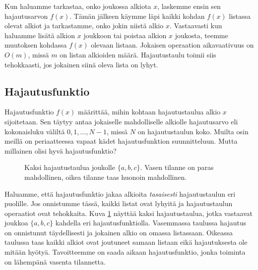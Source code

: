 Kun haluamme tarkastaa, onko joukossa alkiota $x$,
laskemme ensin sen hajautusarvon $f(x)$.
Tämän jälkeen käymme läpi kaikki kohdan $f(x)$
listassa olevat alkiot ja tarkastamme,
onko jokin niistä alkio $x$.
Vastaavasti kun haluamme lisätä alkion $x$ joukkoon
tai poistaa alkion $x$ joukosta,
teemme muutoksen kohdassa $f(x)$ olevaan listaan.
Jokaisen operaation aikavaativuus on $O(m)$,
missä $m$ on listan alkioiden määrä.
Hajautustaulu toimii siis tehokkaasti, jos jokainen
siinä oleva lista on lyhyt.

\subsection{Hajautusfunktio}

Hajautusfunktio $f(x)$ määrittää, mihin kohtaan hajautustaulua
alkio $x$ sijoitetaan.
Sen täytyy antaa jokaiselle mahdolliselle alkiolle
hajautusarvo eli kokonaisluku väliltä $0,1,\dots,N-1$,
missä $N$ on hajautustaulun koko.
Muilta osin meillä on periaatteessa vapaat kädet
hajautusfunktion suunnitteluun.
Mutta millainen olisi hyvä hajautusfunktio?

\begin{figure}
\center
{}
\caption{Kaksi hajautustaulua joukolle $\{a,b,c\}$.
Vasen tilanne on paras mahdollinen, oikea tilanne taas
huonoin mahdollinen.}
\label{fig:hajjak}
\end{figure}

Haluamme, että hajautusfunktio jakaa alkioita \emph{tasaisesti}
hajautustaulun eri puolille.
Jos onnistumme tässä, kaikki listat ovat lyhyitä ja
hajautustaulun operaatiot ovat tehokkaita.
Kuva \ref{fig:hajjak} näyttää kaksi hajautustaulua, jotka vastaavat
joukkoa $\{a,b,c\}$ kahdella eri hajautusfunktiolla.
Vasemmassa taulussa hajautus on onnistunut täydellisesti
ja jokainen alkio on omassa listassaan.
Oikeassa taulussa taas kaikki alkiot ovat joutuneet samaan
listaan eikä hajautuksesta ole mitään hyötyä.
Tavoitteemme on saada aikaan hajautusfunktio,
jonka toiminta on lähempänä vasenta tilannetta.

